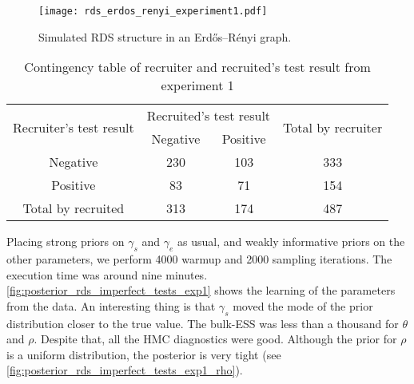 \begin{figure}[htb]
  \centering
  \caption{\label{fig:rds_erdos_renyi_experiment1}Simulated RDS structure in
    an Erdős–Rényi graph.}
  \texttt{[image: rds\_erdos\_renyi\_experiment1.pdf]}
\end{figure}

\begin{table}[htb]
  \centering
  \caption{\label{tab:contingency-table-experiment1}Contingency table of
    recruiter and recruited's test result from experiment 1}
  \begin{tabular}{cccc}
    \hline
    \multirow{2}{*}{Recruiter's test result} & \multicolumn{2}{c}{Recruited's test result} & \multirow{2}{*}{Total by recruiter}       \\ \cline{2-3}
                                             & Negative                                    & Positive                            &     \\ \hline
    Negative                                 & 230                                         & 103                                 & 333 \\
    Positive                                 & 83                                          & 71                                  & 154 \\
    Total by recruited                       & 313                                         & 174                                 & 487 \\ \hline
  \end{tabular}
\end{table}

Placing strong priors on $\gamma_s$ and $\gamma_e$ as usual, and weakly
informative priors on the other parameters, we perform 4000 warmup and 2000
sampling iterations. The execution time was around nine minutes.
\autoref{fig:posterior_rds_imperfect_tests_exp1} shows the learning of the
parameters from the data. An interesting thing is that $\gamma_s$ moved the
mode of the prior distribution closer to the true value. The bulk-ESS was less
than a thousand for $\theta$ and $\rho$. Despite that, all the HMC diagnostics were
good. Although the prior for $\rho$ is a uniform distribution, the posterior
is very tight (see \autoref{fig:posterior_rds_imperfect_tests_exp1_rho}).

